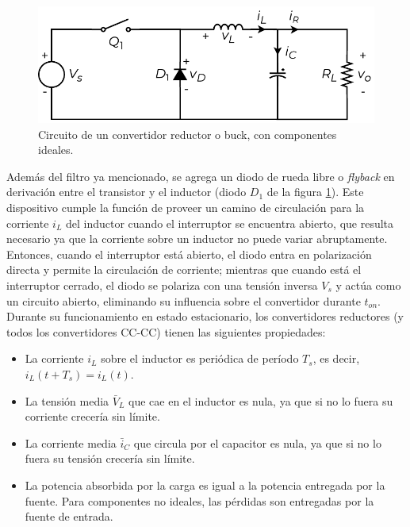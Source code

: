 \begin{figure}[h]
    \centering
    \includegraphics[scale=0.6]{Imagenes/Reductor.pdf}
    \caption{Circuito de un convertidor reductor o buck, con componentes ideales.}
    \label{reductor}
\end{figure}

Además del filtro ya mencionado, se agrega un diodo de rueda libre o \textit{flyback} en derivación entre el transistor y el inductor (diodo $D_1$ de la figura \ref{reductor}). Este dispositivo cumple la función de proveer un camino de circulación para la corriente $i_L$ del inductor cuando el interruptor se encuentra abierto, que resulta necesario ya que la corriente sobre un inductor no puede variar abruptamente. Entonces, cuando el interruptor está abierto, el diodo entra en polarización directa y permite la circulación de corriente; mientras que cuando está el interruptor cerrado, el diodo se polariza con una tensión inversa $V_s$ y actúa como un circuito abierto, eliminando su influencia sobre el convertidor durante $t_{on}$.\\

Durante su funcionamiento en estado estacionario, los convertidores reductores (y todos los convertidores CC-CC) tienen las siguientes propiedades:

\begin{itemize}
    \item La corriente $i_L$ sobre el inductor es periódica de período $T_s$, es decir, $i_L(t+T_s) = i_L(t)$.
    \item La tensión media $\bar{V}_L$ que cae en el inductor es nula, ya que si no lo fuera su corriente crecería sin límite.
    \item La corriente media $\bar{i}_C$ que circula por el capacitor es nula, ya que si no lo fuera su tensión crecería sin límite.
    \item La potencia absorbida por la carga es igual a la potencia entregada por la fuente. Para componentes no ideales, las pérdidas son entregadas por la fuente de entrada.
\end{itemize}

